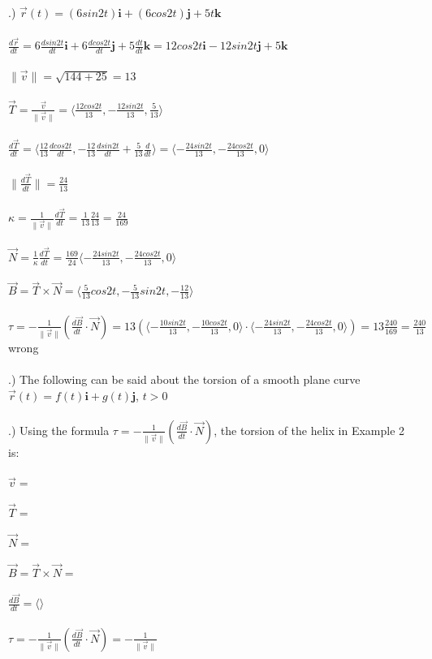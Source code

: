 \documentclass[12pt]{article}
\begin{document}
.) $\vec{r}(t) = (6sin{2t})\mathbf{i} + (6cos{2t})\mathbf{j} + 5t\mathbf{k}$\\\\
\noindent $\frac{d\vec{r}}{dt} = 6\frac{dsin{2t}}{dt}\mathbf{i} + 6\frac{dcos{2t}}{dt}\mathbf{j} + 5\frac{dt}{dt}\mathbf{k} =
12cos{2t}\mathbf{i} - 12sin{2t}\mathbf{j} + 5\mathbf{k}$\\\\
\noindent $\| \vec{v} \| = \sqrt{144 + 25} = 13 $\\\\
\noindent $\vec{T} = \frac{\vec{v}}{\| \vec{v} \|} = \langle \frac{12cos{2t}}{13}, -\frac{12sin{2t}}{13}, \frac{5}{13}\rangle$\\\\
\noindent $\frac{d\vec{T}}{dt} = \langle \frac{12}{13}\frac{dcos{2t}}{dt} , -\frac{12}{13}\frac{dsin{2t}}{dt} + \frac{5}{13}\frac{d}{dt}\rangle
= \langle -\frac{24sin{2t}}{13}, -\frac{24cos{2t}}{13}, 0 \rangle$\\\\
\noindent $\| \frac{d\vec{T}}{dt} \|  = \frac{24}{13}$\\\\
\noindent $\kappa = \frac{1}{\| \vec{v} \| }\frac{d\vec{T}}{dt} = \frac{1}{13}\frac{24}{13} =\frac{24}{169}$\\\\
\noindent $\vec{N} = \frac{1}{\kappa}\frac{d\vec{T}}{dt} = \frac{169}{24}\langle -\frac{24sin{2t}}{13}, -\frac{24cos{2t}}{13}, 0\rangle $\\\\
\noindent $\vec{B} = \vec{T} \times \vec{N} = \langle \frac{5}{13}cos{2t}, -\frac{5}{13}sin{2t}, -\frac{12}{13}\rangle$\\\\
\noindent $\tau = -\frac{1}{\| \vec{v} \| }(\frac{d\vec{B}}{dt}\cdot \vec{N}) = 13(\langle -\frac{10sin{2t}}{13}, -\frac{10cos{2t}}{13}, 0\rangle \cdot \langle -\frac{24sin{2t}}{13}, -\frac{24cos{2t}}{13}, 0\rangle) = 13\frac{240}{169} = \frac{240}{13}$ wrong\\\\
.) The following can be said about the torsion of a smooth plane curve $\vec{r}(t) = f(t)\mathbf{i} + g(t)\mathbf{j}$, \hspace{10pt} $t > 0$\\\\
.) Using the formula $\tau = -\frac{1}{\| \vec{v} \|}(\frac{d\vec{B}}{dt} \cdot \vec{N})$, the torsion of the helix in Example 2 is:\\\\
\noindent $\vec{v} = $\\\\
\noindent $\vec{T} = $\\\\
\noindent $\vec{N} = $\\\\
\noindent $\vec{B} = \vec{T} \times \vec{N} = $\\\\
\noindent $\frac{d\vec{B}}{dt} = \langle \rangle$\\\\
\noindent $\tau = -\frac{1}{\| \vec{v} \|}(\frac{d\vec{B}}{dt} \cdot \vec{N}) = -\frac{1}{\| \vec{v} \| } \frac{}{}$
\end{document}
